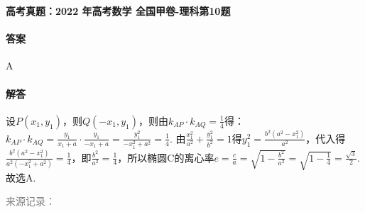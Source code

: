 \documentclass[UTF8,a4paper,11pt]{ctexart}
\newenvironment{gaokao}[1]{\par\medskip\noindent\textbf{高考真题：#1}\par\smallskip}{\par\medskip}
\begin{document}
\begin{gaokao}{2022 年高考数学 全国甲卷-理科第10题}
\paragraph{答案}

A

\paragraph{解答}

设$P(x_1,y_1)$，则$Q(-x_1,y_1)$，则由$k_{AP}\cdot k_{AQ}=\frac{1}{4}$得：$k_{AP}\cdot k_{AQ}=\frac{y_1}{x_1+a}\cdot\frac{y_1}{-x_1+a}=\frac{y_1^2}{-x_1^2+a^2}=\frac{1}{4}$. 由$\frac{x_1^2}{a^2}+\frac{y_1^2}{b^2}=1$得$y_1^2=\frac{b^2(a^2-x_1^2)}{a^2}$，代入得$\frac{b^2(a^2-x_1^2)}{a^2(-x_1^2+a^2)}=\frac{1}{4}$，即$\frac{b^2}{a^2}=\frac{1}{4}$，所以椭圆C的离心率$e=\frac{c}{a}=\sqrt{1-\frac{b^2}{a^2}}=\sqrt{1-\frac{1}{4}}=\frac{\sqrt{3}}{2}$. 故选A.

\par\smallskip\textcolor{gray}{\footnotesize 来源记录：\texttt{}}

\end{gaokao}
\end{document}
